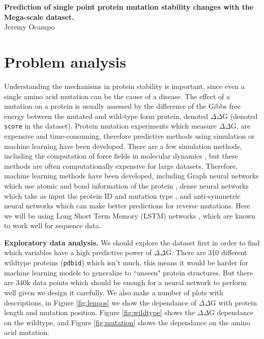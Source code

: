 \documentclass{article}
\newcommand{\dd}{$\Delta\Delta$}
\begin{document}
\vspace{-1cm}
\begin{center}
    \Large{\textbf{Prediction of single point protein mutation stability changes with the Mega-scale dataset.}} \\
    \vspace{0.5cm}
    Jeremy Ocampo
\end{center}

\section{Problem analysis}
Understanding the mechanisms in protein stability is important, since even a single amino acid mutation can be the cause of a disease. The effect of a mutation on a protein is usually assessed by the difference of the Gibbs free energy between the mutated and wild-type form protein, denoted $\Delta\Delta$G (denoted \texttt{score} in the dataset). Protein mutation experiments which measure \dd G, are expensive and time-consuming, therefore predictive methods using simulation or machine learning have been developed. There are a few simulation methods, including the computation of force fields in molecular dynamics \citep{Brooks}, but these methods are often computationally expensive for large datasets. Therefore, machine learning methods have been developed, including Graph neural networks which use atomic and bond information of the protein \citep{Wang2021}, dense neural networks which take as input the protein ID and mutation type \citep{Alvarez-Machancoses}, and anti-symmetric neural networks \citep{Benevenuta_2021} which can make better predictions for reverse mutations. Here we will be using Long Short Term Memory (LSTM) networks \citep{lstm}, which are known to work well for sequence data.

\textbf{Exploratory data analysis.} We should explore the dataset first in order to find which variables have a high predictive power of $\Delta\Delta$G. There are 310 different wildtype proteins (\texttt{pdbid}) which isn't much, this means it would be harder for machine learning models to generalize to ``unseen" protein structures. But there are 340k data points which should be enough for a neural network to perform well given we design it carefully. We also make a number of plots with descriptions, in Figure \ref{fig:lenpos} we show the dependance of \dd G with protein length and mutation position. Figure \ref{fig:wildtype} shows the \dd G dependance on the wildtype, and Figure \ref{fig:mutation} shows the dependance on the amino acid mutation.
\end{document}
